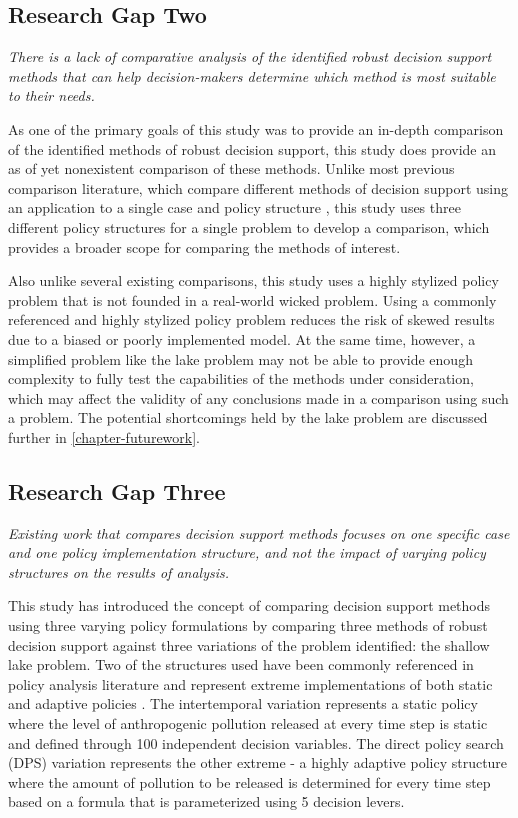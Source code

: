     \subsection{Research Gap Two}
    \textit{There is a lack of comparative analysis of the identified robust decision support methods that can help decision-makers determine which method is most suitable to their needs.}
    
    As one of the primary goals of this study was to provide an in-depth comparison of the identified methods of robust decision support, this study does provide an as of yet nonexistent comparison of these methods. Unlike most previous comparison literature, which compare different methods of decision support using an application to a single case and policy structure \citep{Gersonius2016,Hall2012,Roach2015}, this study uses three different policy structures for a single problem to develop a comparison, which provides a broader scope for comparing the methods of interest. 
    
    Also unlike several existing comparisons, this study uses a highly stylized policy problem that is not founded in a real-world wicked problem. Using a commonly referenced and highly stylized policy problem reduces the risk of skewed results due to a biased or poorly implemented model. At the same time, however, a simplified problem like the lake problem may not be able to provide enough complexity to fully test the capabilities of the methods under consideration, which may affect the validity of any conclusions made in a comparison using such a problem. The potential shortcomings held by the lake problem are discussed further in \cref{chapter-futurework}. 
    
    \subsection{Research Gap Three}
    \textit{Existing work that compares decision support methods focuses on one specific case and one policy implementation structure, and not the impact of varying policy structures on the results of analysis.}
    
    This study has introduced the concept of comparing decision support methods using three varying policy formulations by comparing three methods of robust decision support against three variations of the problem identified: the shallow lake problem. Two of the structures used have been commonly referenced in policy analysis literature and represent extreme implementations of both static and adaptive policies \citep{Carpenter1999, Quinn2017, Singh2015, Ward2015}. The intertemporal variation represents a static policy where the level of anthropogenic pollution released at every time step is static and defined through 100 independent decision variables. The direct policy search (DPS) variation represents the other extreme - a highly adaptive policy structure where the amount of pollution to be released is determined for every time step based on a formula that is parameterized using 5 decision levers. 
    
